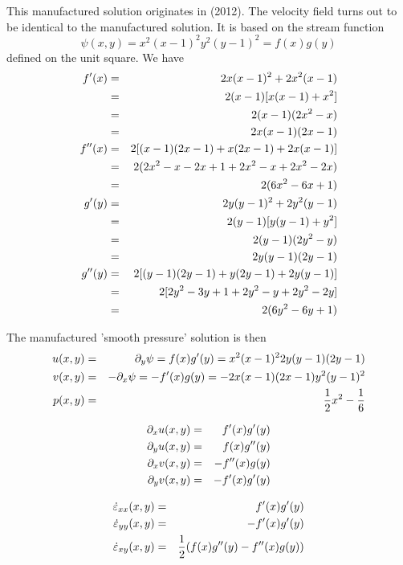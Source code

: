 This manufactured solution originates in \textcite{bocg12} (2012).
The velocity field turns out to be identical to the \textcite{dohu03} manufactured solution.
It is based on the stream function 
\[
\psi (x,y)=x^2(x-1)^2y^2(y-1)^2 =f(x)g(y)
\]
defined on the unit square. We have 
\begin{eqnarray}
f'(x)
&=&2x(x-1)^2+2x^2(x-1) \nonumber\\
&=&2(x-1)[x(x-1)+x^2]  \nonumber\\
&=&2(x-1)(2x^2 -x)  \nonumber\\
&=&2x(x-1)(2x -1)  \nonumber\\
f''(x)
&=& 2 [ (x-1)(2x -1) + x(2x-1)+2x(x-1)] \nonumber\\
&=& 2 (2x^2 -x-2x+1 + 2x^2-x+2x^2-2x) \nonumber\\
&=& 2 (6x^2 -6x +1) \nonumber\\
g'(y)
&=& 2y (y-1)^2 + 2y^2(y-1)  \nonumber\\
&=& 2(y-1)[y(y-1)+y^2] \nonumber\\
&=& 2(y-1)(2y^2-y) \nonumber\\
&=& 2y(y-1)(2y-1) \nonumber\\
g''(y) 
&=& 2[ (y-1)(2y-1) +y(2y-1)+2y(y-1) ] \nonumber\\
&=& 2[ 2y^2 - 3y +1 +2y^2-y +2y^2-2y] \nonumber\\
&=& 2(6y^2 -6y+1)
\end{eqnarray}

The manufactured 'smooth pressure' solution is then
\begin{eqnarray}
u(x,y) &=& \partial_y \psi = f(x)g'(y) = x^2(x-1)^2 2y(y-1)(2y-1) \nonumber\\
v(x,y) &=& -\partial_x \psi = -f'(x)g(y) = -2x(x-1)(2x -1)y^2(y-1)^2 \nonumber\\
p(x,y) &=& \frac12 x^2 -\frac16 \nonumber
\end{eqnarray}

\begin{eqnarray}
\partial_x u (x,y)&=& f'(x)g'(y)\nonumber\\
\partial_y u (x,y)&=& f(x)g''(y)\nonumber\\
\partial_x v (x,y)&=& -f''(x)g(y)\nonumber\\
\partial_y v (x,y)&=& -f'(x)g'(y)\nonumber
\end{eqnarray}

\begin{eqnarray}
\dot\varepsilon_{xx}(x,y) &=& f'(x)g'(y) \nonumber\\
\dot\varepsilon_{yy}(x,y) &=&  -f'(x)g'(y) \nonumber\\
\dot\varepsilon_{xy}(x,y) &=& \frac12(f(x)g''(y)-f''(x)g(y)) \nonumber
\end{eqnarray}

